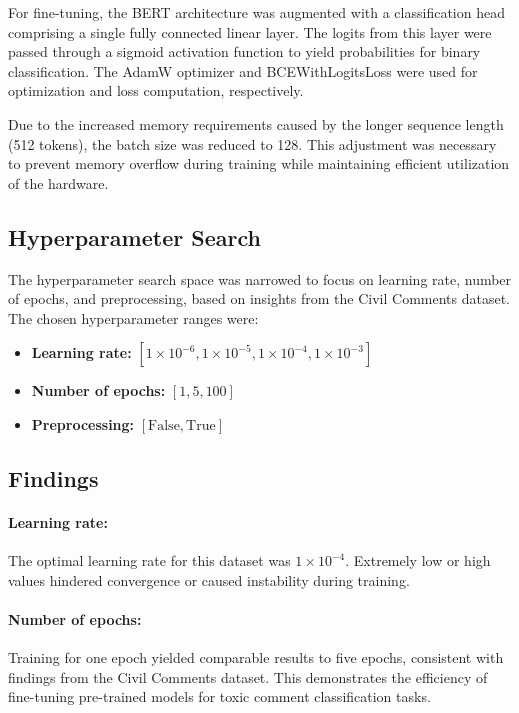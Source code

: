 For fine-tuning, the BERT architecture was augmented with a classification head comprising a single fully connected linear layer. The logits from this layer were passed through a sigmoid activation function to yield probabilities for binary classification. The AdamW optimizer and BCEWithLogitsLoss were used for optimization and loss computation, respectively.

Due to the increased memory requirements caused by the longer sequence length (512 tokens), the batch size was reduced to 128. This adjustment was necessary to prevent memory overflow during training while maintaining efficient utilization of the hardware.

\subsection{Hyperparameter Search}

The hyperparameter search space was narrowed to focus on learning rate, number of epochs, and preprocessing, based on insights from the Civil Comments dataset. The chosen hyperparameter ranges were:

\begin{itemize} \item \textbf{Learning rate:} $[1 \times 10^{-6}, 1 \times 10^{-5}, 1 \times 10^{-4}, 1 \times 10^{-3}]$ \item \textbf{Number of epochs:} $[1, 5, 100]$ \item \textbf{Preprocessing:} $[\text{False}, \text{True}]$ \end{itemize}

\subsection{Findings}

\paragraph{Learning rate:} The optimal learning rate for this dataset was $1 \times 10^{-4}$. Extremely low or high values hindered convergence or caused instability during training.

\paragraph{Number of epochs:} Training for one epoch yielded comparable results to five epochs, consistent with findings from the Civil Comments dataset. This demonstrates the efficiency of fine-tuning pre-trained models for toxic comment classification tasks.

